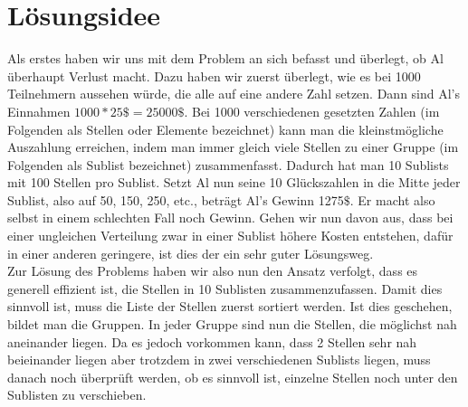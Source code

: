 \documentclass[a4paper,10pt,ngerman]{scrartcl}
\title{\Huge\Aufgabe}
\author{\LARGE\Name\\Team-ID: \TeamId}
\date{\LARGE\today}
\begin{document}
\maketitle
\tableofcontents

\section{Lösungsidee}
Als erstes haben wir uns mit dem Problem an sich befasst und überlegt, ob Al überhaupt Verlust macht. Dazu haben wir zuerst überlegt, wie es bei 1000 Teilnehmern aussehen würde, die alle auf eine andere Zahl setzen. Dann sind Al's Einnahmen $ 1000 \ast 25 \$ = 25000\$ $. Bei 1000 verschiedenen gesetzten Zahlen (im Folgenden als Stellen oder Elemente bezeichnet) kann man die kleinstmögliche Auszahlung erreichen, indem man immer gleich viele Stellen zu einer Gruppe (im Folgenden als Sublist bezeichnet) zusammenfasst. Dadurch hat man 10 Sublists mit 100 Stellen pro Sublist. Setzt Al nun seine 10 Glückszahlen in die Mitte jeder Sublist, also auf 50, 150, 250, etc., beträgt Al's Gewinn 1275$\$$. Er macht also selbst in einem schlechten Fall noch Gewinn. Gehen wir nun davon aus, dass bei einer ungleichen Verteilung zwar in einer Sublist höhere Kosten entstehen, dafür in einer anderen geringere, ist dies der ein sehr guter Lösungsweg. \\
Zur Lösung des Problems haben wir also nun den Ansatz verfolgt, dass es generell effizient ist, die Stellen in 10 Sublisten zusammenzufassen. Damit dies sinnvoll ist, muss die Liste der Stellen zuerst sortiert werden. Ist dies geschehen, bildet man die Gruppen. In jeder Gruppe sind nun die Stellen, die möglichst nah aneinander liegen. Da es jedoch vorkommen kann, dass 2 Stellen sehr nah beieinander liegen aber trotzdem in zwei verschiedenen Sublists liegen, muss danach noch überprüft werden, ob es sinnvoll ist, einzelne Stellen noch unter den Sublisten zu verschieben.
\end{document}
